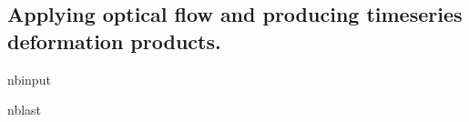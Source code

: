 \documentclass[letterpaper,10pt,english]{sphinxmanual}
\begin{document}
\subsection{Applying optical flow and producing time\sphinxhyphen{}series deformation products.}
\label{\detokenize{notebooks/RockGlacier_optical:Applying-optical-flow-and-producing-time-series-deformation-products.}}
\begin{sphinxuseclass}{nbinput}
\begin{sphinxuseclass}{nblast}
{
\begin{sphinxVerbatim}[commandchars=\\\{\}]
\llap{\color{nbsphinxin}[ ]:\,\hspace{\fboxrule}\hspace{\fboxsep}} 


\end{sphinxVerbatim}}
\end{sphinxuseclass}
\end{sphinxuseclass}
\end{document}
